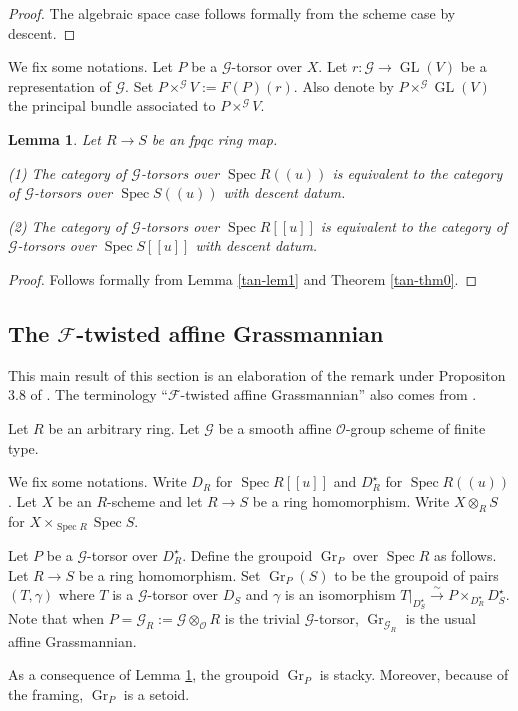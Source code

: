 \documentclass[11pt]{amsart}
\newtheorem{lem}{Lemma}
\numberwithin{thm}{section}
\numberwithin{lem}{section}
\numberwithin{cor}{section}
\numberwithin{prop}{section}
\numberwithin{exam}{section}
\numberwithin{dfn}{section}
\newcommand{\GR}{\operatorname{Gr}}
\newcommand{\GL}{\operatorname{GL}}
\newcommand{\spec}{\operatorname{Spec}}
\newcommand{\mysection}{\subsection}
\newcommand{\cO}{\mathcal{O}}
\newcommand{\cF}{\mathcal{F}}
\newcommand{\cG}{\mathcal{G}}
\begin{document}
\begin{appendices}
\begin{proof}
The algebraic space case follows formally from the scheme case by descent.
\end{proof}

We fix some notations.
Let $P$ be a $\cG$-torsor over $X$.
Let $r: \cG \to \GL(V)$ be a representation of $\cG$.
Set $P\times^{\cG}V := F(P)(r)$.
Also denote by $P\times^{\cG}\GL(V)$ the 
principal bundle associated to
$P\times^{\cG}V$.

\begin{lem}
\label{tan-lem-2}
Let $R\to S$ be an fpqc ring map.

(1)
The category of $\cG$-torsors over $\spec R(\!(u)\!)$
is equivalent to the category of $\cG$-torsors over $\spec S(\!(u)\!)$
with descent datum.

(2)
The category of $\cG$-torsors over $\spec R[\![u]\!]$
is equivalent to the category of $\cG$-torsors over $\spec S[\![u]\!]$
with descent datum.
\end{lem}

\begin{proof}
Follows formally from Lemma \ref{tan-lem1} and Theorem \ref{tan-thm0}.
\end{proof}


\mysection{The $\cF$-twisted affine Grassmannian}
\label{taGR}

This main result of this section is an elaboration of the remark under Propositon 3.8
of \cite{Dri06}.
The terminology ``$\cF$-twisted affine Grassmannian''
also comes from \cite{Dri06}.

Let $R$ be an arbitrary ring.
Let $\cG$ be a smooth affine $\cO$-group scheme of finite type.

We fix some notations.
Write $D_R$ for $\spec R[\![u]\!]$ and $D_R^\star$ for $\spec R(\!(u)\!)$.
Let $X$ be an $R$-scheme and let $R\to S$ be a ring homomorphism.
Write $X\otimes_RS$ for $X\times_{\spec R}\spec S$.

Let $P$ be a $\cG$-torsor over $D_R^\star$.
Define the groupoid $\GR_P$ over $\spec R$ as follows.
Let $R\to S$ be a ring homomorphism.
Set $\GR_P(S)$ to be the groupoid of pairs
$(T,\gamma)$ where $T$ is a $\cG$-torsor over $D_S$
and $\gamma$ is an isomorphism 
$T|_{D_S^\star}\xrightarrow{\sim} P\times_{D_R^\star}D_S^\star$.
Note that when $P = \cG_R := \cG \otimes_{\cO} R$ is the trivial $\cG$-torsor,
$\GR_{\cG_R}$ is the usual affine Grassmannian.

As a consequence of Lemma \ref{tan-lem-2},
the groupoid $\GR_{P}$ is stacky.
Moreover, because of the framing, $\GR_{P}$ is a setoid.


\end{appendices}
\end{document}
